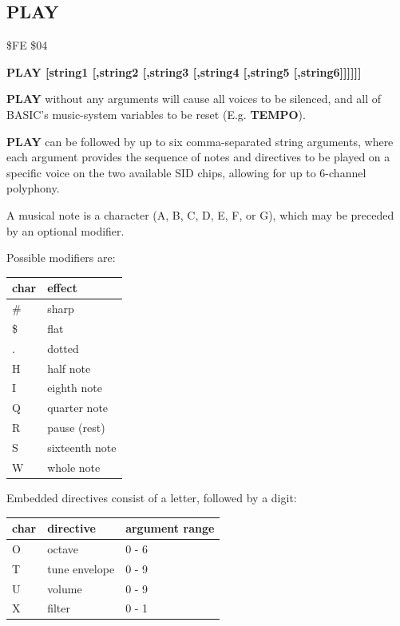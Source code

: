 \subsection{PLAY}
\begin{description}[leftmargin=2cm,style=nextline]
\item [Token:] \$FE \$04
\item [Format:] {\bf PLAY [string1 [,string2 [,string3 [,string4 [,string5 [,string6]]]]]]}
\item [Usage:] {\bf PLAY} without any arguments will cause all voices to be silenced,
               and all of BASIC's music-system variables to be reset (E.g. {\bf TEMPO}).

               {\bf PLAY} can be followed by up to six comma-separated string arguments,
               where each argument provides the sequence of notes and directives to be played on
               a specific voice on the two available SID chips, allowing for up to 6-channel polyphony.

               A musical note is a character (A, B, C, D, E, F, or G),
               which may be preceded by an optional modifier.

               Possible modifiers are:
\begin{center}
{\setlength{\tabcolsep}{1mm}
\ttfamily
\begin{tabular}{*{1}{|R{9mm}}|l|}
\hline
 char  & effect \\
\hline
 \# & sharp \\
 \$ & flat \\
  . & dotted \\
  H & half note \\
  I & eighth note \\
  Q & quarter note \\
  R & pause (rest) \\
  S & sixteenth note \\
  W & whole note \\
\hline
\end{tabular}
}
\end{center}

Embedded directives consist of a letter, followed by a digit:

\begin{center}
{\setlength{\tabcolsep}{1mm}
\ttfamily
\begin{tabular}{*{1}{|R{9mm}}|l|l|}
\hline
 char  & directive & argument range \\
\hline
  O & octave        & 0 - 6 \\
  T & tune envelope & 0 - 9 \\
  U & volume        & 0 - 9 \\
  X & filter        & 0 - 1 \\
\hline
\end{tabular}
}
\end{center}


\end{description}
